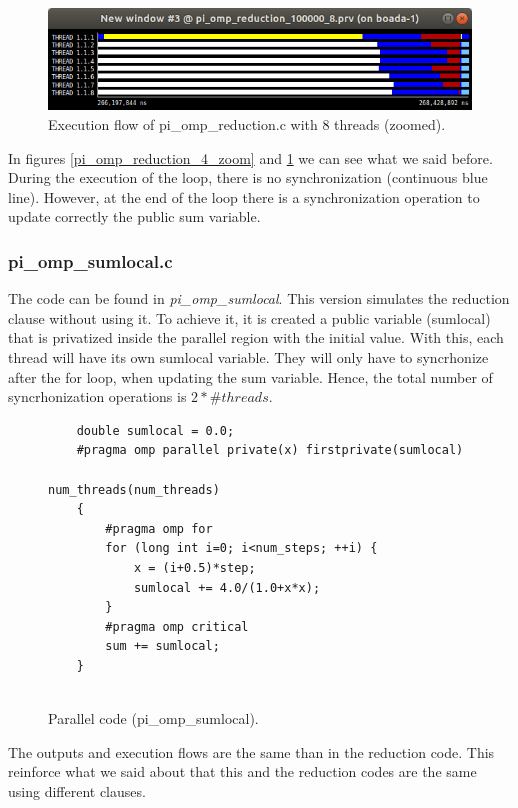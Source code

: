 \documentclass[12pt, a4paper]{article}
\begin{document}
\begin{figure}[H]
  \centering
  \includegraphics[scale=0.5]{./images/pi_omp_reduction_8_zoom}
  \caption{Execution flow of pi\_omp\_reduction.c with 8 threads (zoomed).}
  \label{pi_omp_reduction_8_zoom}
\end{figure}

In figures \ref{pi_omp_reduction_4_zoom} and \ref{pi_omp_reduction_8_zoom} we can see what we said before. During the execution of the loop, there is no synchronization (continuous blue line). However, at the end of the loop there is a synchronization operation to update correctly the public sum variable.

\subsubsection{pi\_omp\_sumlocal.c}

The code can be found in \textit{pi\_omp\_sumlocal}. This version simulates the reduction clause without using it. To achieve it, it is created a public variable (sumlocal) that is privatized inside the parallel region with the initial value. With this, each thread will have its own sumlocal variable. They will only have to syncrhonize after the for loop, when updating the sum variable. Hence, the total number of syncrhonization operations is $2 * \#threads$.

\begin{figure}[H]
	\begin{lstlisting}
	double sumlocal = 0.0;
	#pragma omp parallel private(x) firstprivate(sumlocal)
									num_threads(num_threads)
    {
        #pragma omp for 
        for (long int i=0; i<num_steps; ++i) {
            x = (i+0.5)*step;
            sumlocal += 4.0/(1.0+x*x);
        }
        #pragma omp critical 
		sum += sumlocal;
    }


	\end{lstlisting}
	
	\caption{Parallel code (pi\_omp\_sumlocal).}
\end{figure}

The outputs and execution flows are the same than in the reduction code. This reinforce what we said about that this and the reduction codes are the same using different clauses.
\end{document}
